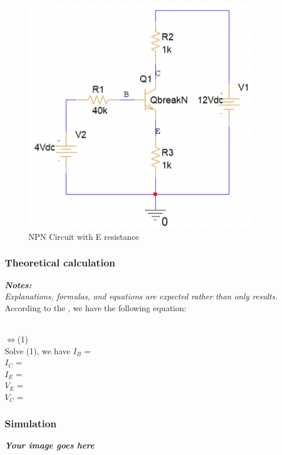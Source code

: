 \begin{figure}[H]
    \centering
    \includegraphics[width=10cm]{source/picture/bai_3/lab3_ex9_de.png}
    \caption{NPN Circuit with E resistance}
    \label{lab3_ex9_de}
\end{figure}

\subsubsection{Theoretical calculation}
\textit{\textbf{Notes:}}\\
\textit{Explanations, formulas, and equations are expected rather than only results.}
\bigskip\\

According to the \dotfill, we have the following equation:\bigskip\\
\dotfill\bigskip\par\mbox{}\dotfill\bigskip\\
$\iff$\dotfill (1)\bigskip \\
Solve (1), we have $I_B$ = \dotfill\bigskip\\
$I_C$ = \dotfill\bigskip\\
$I_E$ = \dotfill \bigskip\\
$V_E$ = \dotfill \bigskip \\
$V_C$ = \dotfill \bigskip \\

\subsubsection{Simulation}
\textbf{\textit{Your image goes here}}
\vspace{8cm}


